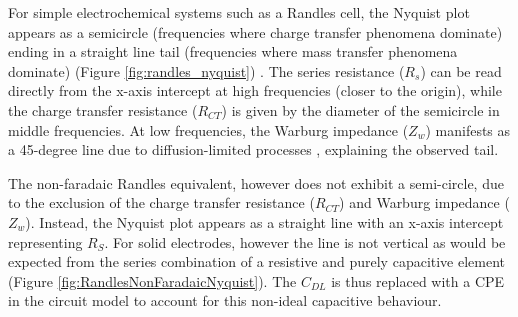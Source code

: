 For simple electrochemical systems such as a Randles cell, the Nyquist plot appears as a semicircle (frequencies where charge transfer phenomena dominate) ending in a straight line tail (frequencies where mass transfer phenomena dominate) (Figure \ref{fig:randles_nyquist}) \cite{lazanasErratumElectrochemicalImpedance2025}. The series resistance ($R_s$) can be read directly from the x-axis intercept at high frequencies (closer to the origin), while the charge transfer resistance ($R_{CT}$) is given by the diameter of the semicircle in middle frequencies. At low frequencies, the Warburg impedance ($Z_w$) manifests as a 45-degree line due to diffusion-limited processes \cite{lazanasErratumElectrochemicalImpedance2025}, explaining the observed tail.

The non-faradaic Randles equivalent, however does not exhibit a semi-circle, due to the exclusion of the charge transfer resistance ($R_{CT}$) and Warburg impedance ($Z_w$). Instead, the Nyquist plot appears as a straight line with an x-axis intercept representing $R_S$. For solid electrodes, however the line is not vertical as would be expected from the series combination of a resistive and purely capacitive element \cite{xieReviewAdvancementsNanoscale2020a} (Figure \ref{fig:RandlesNonFaradaicNyquist}). The $C_{DL}$ is thus replaced with a \ac{CPE} in the circuit model to account for this non-ideal capacitive behaviour.

